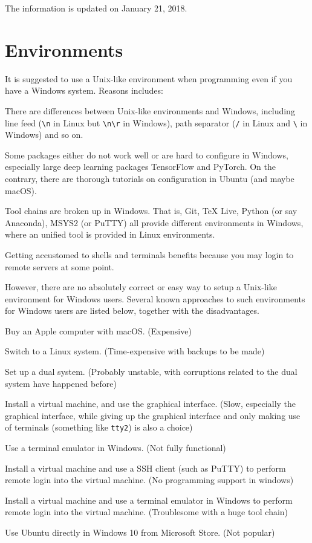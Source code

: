 \documentclass[english]{../TeXTemplate/pkupaper}
\title{\titlemark}
\author{pppppass}
\date{Updated on January 22, 2018}
\begin{document}
\maketitle

The information is updated on January 21, 2018.

\section{Environments}

It is suggested to use a Unix-like environment when programming even if you have a Windows system. Reasons includes:
\begin{partlist}
\item There are differences between Unix-like environments and Windows, including line feed (\verb"\n" in Linux but \verb"\n\r" in Windows), path separator (\verb"/" in Linux and \verb"\" in Windows) and so on.
\item Some packages either do not work well or are hard to configure in Windows, especially large deep learning packages TensorFlow and PyTorch. On the contrary, there are thorough tutorials on configuration in Ubuntu (and maybe macOS).
\item Tool chains are broken up in Windows. That is, Git, TeX Live, Python (or say Anaconda), MSYS2 (or PuTTY) all provide different environments in Windows, where an unified tool is provided in Linux environments.
\item Getting accustomed to shells and terminals benefits because you may login to remote servers at some point.
\end{partlist}

However, there are no absolutely correct or easy way to setup a Unix-like environment for Windows users. Several known approaches to such environments for Windows users are listed below, together with the disadvantages.
\begin{partlist}
\item Buy an Apple computer with macOS. (Expensive)
\item Switch to a Linux system. (Time-expensive with backups to be made)
\item Set up a dual system. (Probably unstable, with corruptions related to the dual system have happened before)
\item Install a virtual machine, and use the graphical interface. (Slow, especially the graphical interface, while giving up the graphical interface and only making use of terminals (something like \verb"tty2") is also a choice)
\item Use a terminal emulator in Windows. (Not fully functional)
\item Install a virtual machine and use a SSH client (such as PuTTY) to perform remote login into the virtual machine. (No programming support in windows)
\item Install a virtual machine and use a terminal emulator in Windows to perform remote login into the virtual machine. (Troublesome with a huge tool chain)
\item Use Ubuntu directly in Windows 10 from Microsoft Store. (Not popular)
\end{partlist}
\end{document}
